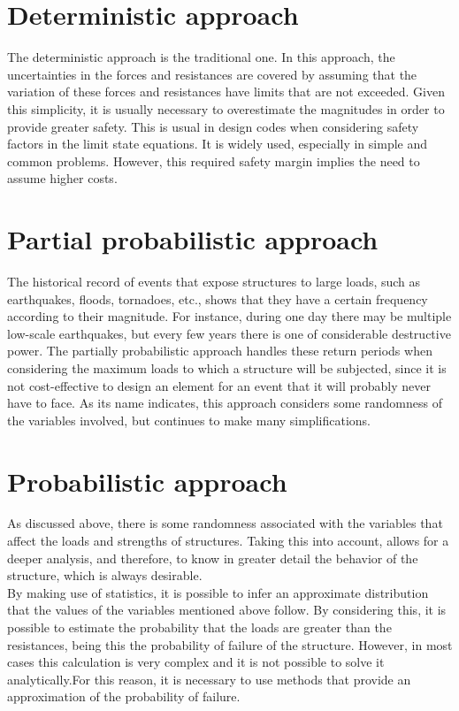 \section{Deterministic approach}
The deterministic approach is the traditional one. In this approach, the uncertainties
in the forces and resistances are covered by assuming that the variation of these
forces and resistances have limits that are not exceeded. Given this simplicity,
it is usually necessary to overestimate the magnitudes in order to provide greater
safety. This is usual in design codes when considering safety factors in the limit
state equations. It is widely used, especially in simple and common problems.
However, this required safety margin implies the need to assume higher costs. 
\section{Partial probabilistic approach}
The historical record of events that expose structures to large loads, such as
earthquakes, floods, tornadoes, etc., shows that they have a certain frequency
according to their magnitude. For instance, during one day there may be multiple
low-scale earthquakes, but every few years there is one of considerable destructive
power. The partially probabilistic approach handles these return periods when considering
the maximum loads to which a structure will be subjected, since it is not cost-effective
to design an element for an event that it will probably never have to face. As its
name indicates, this approach considers some randomness of the variables involved,
but continues to make many simplifications.

\section{Probabilistic approach}
As discussed above, there is some randomness associated with the variables that
affect the loads and strengths of structures. Taking this into account, allows
for a deeper analysis, and therefore, to know in greater detail the behavior of
the structure, which is always desirable. \\

By making use of statistics, it is possible to infer an approximate distribution
that the values of the variables mentioned above follow. By considering this, it
is possible to estimate the probability that the loads are greater than the
resistances, being this the probability of failure of the structure. However,
in most cases this calculation is very complex and it is not possible to solve
it analytically.For this reason, it is necessary to use methods that provide an
approximation of the probability of failure.

